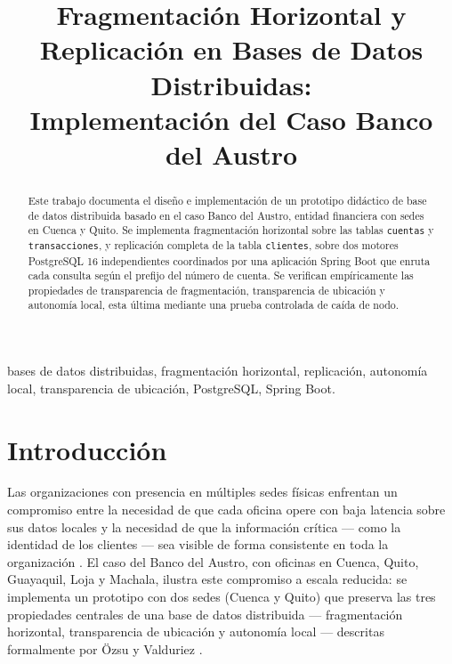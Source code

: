 \documentclass[conference]{IEEEtran}
\begin{document}
\title{Fragmentaci\'on Horizontal y Replicaci\'on en Bases de Datos Distribuidas: \\
Implementaci\'on del Caso Banco del Austro}

\author{
}

\maketitle

\begin{abstract}
Este trabajo documenta el dise\~no e implementaci\'on de un prototipo did\'actico de base
de datos distribuida basado en el caso Banco del Austro, entidad financiera con
sedes en Cuenca y Quito. Se implementa fragmentaci\'on horizontal sobre las tablas
\texttt{cuentas} y \texttt{transacciones}, y replicaci\'on completa de la tabla
\texttt{clientes}, sobre dos motores PostgreSQL 16 independientes coordinados por
una aplicaci\'on Spring Boot que enruta cada consulta seg\'un el prefijo del n\'umero
de cuenta. Se verifican emp\'iricamente las propiedades de transparencia de
fragmentaci\'on, transparencia de ubicaci\'on y autonom\'ia local, esta \'ultima
mediante una prueba controlada de ca\'ida de nodo.
\end{abstract}

\begin{IEEEkeywords}
bases de datos distribuidas, fragmentaci\'on horizontal, replicaci\'on, autonom\'ia
local, transparencia de ubicaci\'on, PostgreSQL, Spring Boot.
\end{IEEEkeywords}

\section{Introducci\'on}

Las organizaciones con presencia en m\'ultiples sedes f\'isicas enfrentan un
compromiso entre la necesidad de que cada oficina opere con baja latencia sobre
sus datos locales y la necesidad de que la informaci\'on cr\'itica --- como la
identidad de los clientes --- sea visible de forma consistente en toda la
organizaci\'on \cite{kleppmann2017}. El caso del Banco del Austro, con oficinas
en Cuenca, Quito, Guayaquil, Loja y Machala, ilustra este compromiso a escala
reducida: se implementa un prototipo con dos sedes (Cuenca y Quito) que preserva
las tres propiedades centrales de una base de datos distribuida --- fragmentaci\'on
horizontal, transparencia de ubicaci\'on y autonom\'ia local --- descritas
formalmente por \"Ozsu y Valduriez \cite{ozsu2020}.
\end{document}
